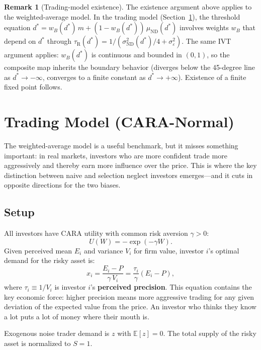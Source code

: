 \documentclass[12pt]{article}
\theoremstyle{plain}
\theoremstyle{definition}
\newtheorem{remark}{Remark}
\newcommand{\E}{\mathbb{E}}
\newcommand{\ND}{\mathrm{ND}}
\newcommand{\R}{\mathrm{R}}
\begin{document}
\begin{remark}[Trading-model existence]
\label{rmk:trading_existence}
The existence argument above applies to the weighted-average model. In the trading model (Section~\ref{sec:trading}), the threshold equation $d^* = w_B(d^*)\,m + (1-w_B(d^*))\,\mu_{\ND}(d^*)$ involves weights $w_B$ that depend on $d^*$ through $\tau_\R(d^*) = 1/(\sigma_{\ND}^2(d^*)/4 + \sigma_\varepsilon^2)$. The same IVT argument applies: $w_B(d^*)$ is continuous and bounded in $(0,1)$, so the composite map inherits the boundary behavior (diverges below the 45-degree line as $d^* \to -\infty$, converges to a finite constant as $d^* \to +\infty$). Existence of a finite fixed point follows.
\end{remark}


\section{Trading Model (CARA-Normal)}
\label{sec:trading}

The weighted-average model is a useful benchmark, but it misses something important: in real markets, investors who are more confident trade more aggressively and thereby earn more influence over the price. This is where the key distinction between naive and selection neglect investors emerges---and it cuts in opposite directions for the two biases.

\subsection{Setup}

All investors have CARA utility with common risk aversion $\gamma > 0$:
\[
U(W) = -\exp(-\gamma W).
\]
Given perceived mean $E_i$ and variance $V_i$ for firm value, investor $i$'s optimal demand for the risky asset is:
\begin{equation}
x_i = \frac{E_i - P}{\gamma\, V_i} = \frac{\tau_i}{\gamma}(E_i - P),
\label{eq:demand}
\end{equation}
where $\tau_i \equiv 1/V_i$ is investor $i$'s \textbf{perceived precision}. This equation contains the key economic force: higher precision means more aggressive trading for any given deviation of the expected value from the price. An investor who thinks they know a lot puts a lot of money where their mouth is.

Exogenous noise trader demand is $z$ with $\E[z] = 0$. The total supply of the risky asset is normalized to $S = 1$.
\end{document}

